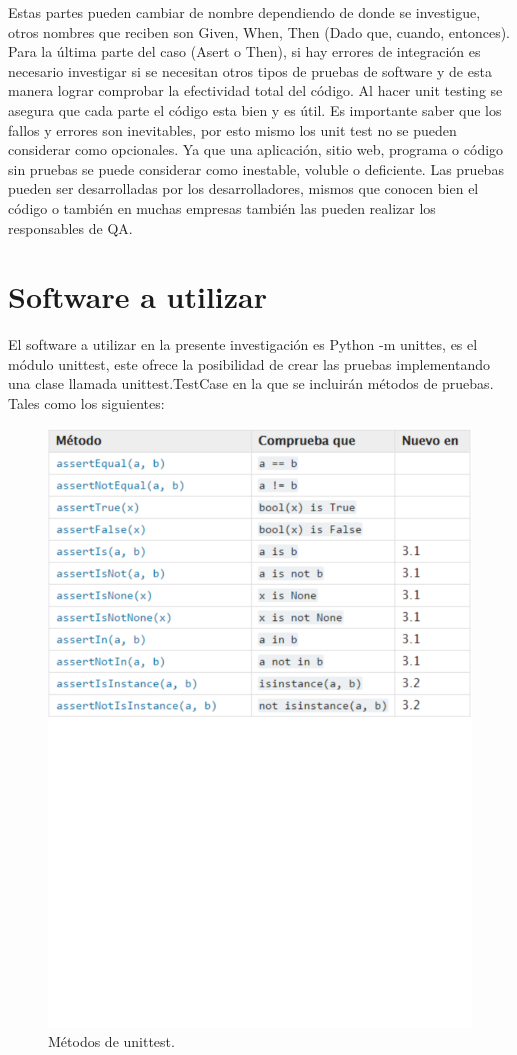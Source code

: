 \documentclass[conference]{IEEEtran}
\begin{document}
Estas partes pueden cambiar de nombre dependiendo de donde se investigue, otros nombres que reciben son Given, When, Then (Dado que, cuando, entonces).
Para la última parte del caso (Asert o Then), si hay errores de integración es necesario investigar si se necesitan otros tipos de pruebas de software y de esta manera lograr comprobar la efectividad total del código.
Al hacer unit testing se asegura que cada parte el código esta bien y es útil. Es importante saber que los fallos y errores son inevitables, por esto mismo los unit test no se pueden considerar como opcionales. Ya que una aplicación, sitio web, programa o código sin pruebas se puede considerar como inestable, voluble o deficiente.
Las pruebas pueden ser desarrolladas por los desarrolladores, mismos que conocen bien el código o también en muchas empresas también las pueden realizar los responsables de QA.

\section{Software a utilizar}

El software a utilizar en la presente investigación es Python -m unittes, es el módulo unittest, este ofrece la posibilidad de crear las pruebas implementando una clase llamada unittest.TestCase en la que se incluirán métodos de pruebas. Tales como los siguientes: 

\begin{figure}[H]
\centering
\includegraphics[scale=0.45]{imagenes/metodos_-m.pdf}
\caption{Métodos de unittest.}
\end{figure}
\end{document}
